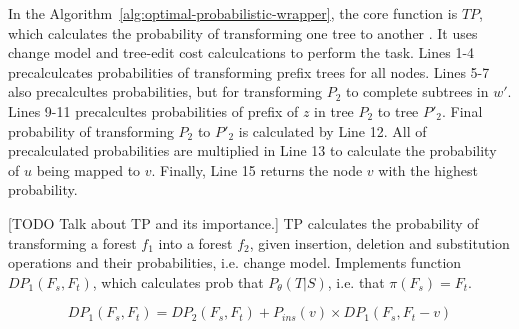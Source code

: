 In the Algorithm~\ref{alg:optimal-probabilistic-wrapper}, the core function is $TP$, which calculates the probability of transforming one tree to another \cite{dalvi2009a}. It uses change model and tree-edit cost calculcations to perform the task. Lines 1-4 precalculcates probabilities of transforming prefix trees for all nodes. Lines 5-7 also precalcultes probabilities, but for transforming $P_2$ to complete subtrees in $w'$. Lines 9-11 precalcultes probabilities of prefix of $z$ in tree $P_2$ to tree $P'_2$. Final probability of transforming $P_2$ to $P'_2$ is calculated by Line 12. All of precalculated probabilities are multiplied in Line 13 to calculate the probability of $u$ being mapped to $v$. Finally, Line 15 returns the node $v$ with the highest probability.

[TODO Talk about TP and its importance.]
TP calculates the probability of transforming a forest $f_1$ into a forest $f_2$, given insertion, deletion and substitution operations and their probabilities, i.e. change model. Implements function $DP_1(F_s, F_t)$, which calculates prob that $P_{\theta}(T|S)$, i.e. that $\pi(F_s) = F_t$.

$$DP_1(F_s, F_t) = DP_2(F_s, F_t) + P_{ins}(v) \times DP_1(F_s, F_t - v)$$





